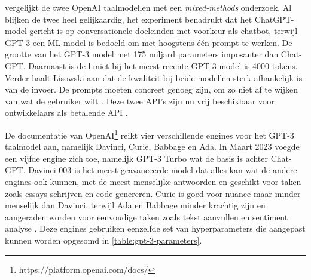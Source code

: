 \textcite{Lisowski2023} vergelijkt de twee OpenAI taalmodellen met een \textit{mixed-methods} onderzoek. Al blijken de twee heel gelijkaardig, het experiment benadrukt dat het ChatGPT-model gericht is op conversationele doeleinden met voorkeur als chatbot, terwijl GPT-3 een ML-model is bedoeld om met hoogstens één prompt te werken. De grootte van het GPT-3 model met 175 miljard parameters imposanter dan Chat-GPT. Daarnaast is de limiet bij het meest recente GPT-3 model is 4000 tokens. Verder haalt Lisowski aan dat de kwaliteit bij beide modellen sterk afhankelijk is van de invoer. De prompts moeten concreet genoeg zijn, om zo niet af te wijken van wat de gebruiker wilt \autocite{Lisowski2023}. Deze twee API's zijn nu vrij beschikbaar voor ontwikkelaars als betalende API \autocite{Brockman2023}.

\medspace

De documentatie van OpenAI\footnote{https://platform.openai.com/docs/} reikt vier verschillende engines voor het GPT-3 taalmodel aan, namelijk Davinci, Curie, Babbage en Ada. In Maart 2023 voegde een vijfde engine zich toe, namelijk GPT-3 Turbo wat de basis is achter Chat-GPT. Davinci-003 is het meest geavanceerde model dat alles kan wat de andere engines ook kunnen, met de meest menselijke antwoorden en geschikt voor taken zoals essays schrijven en code genereren. Curie is goed voor nuance maar minder menselijk dan Davinci, terwijl Ada en Babbage minder krachtig zijn en aangeraden worden voor eenvoudige taken zoals tekst aanvullen en sentiment analyse \autocite{Brockman2023}. Deze engines gebruiken eenzelfde set van hyperparameters die aangepast kunnen worden opgesomd in \ref{table:gpt-3-parameters}.

